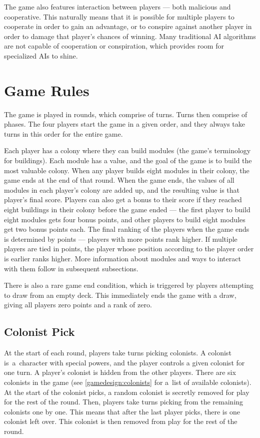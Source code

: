 The game also features interaction between players --- both malicious and cooperative.
This naturally means that it is possible for multiple players to cooperate in order
to gain an advantage, or to conspire against another player in order to damage
that player's chances of winning. Many traditional AI algorithms are not capable
of cooperation or conspiration, which provides room for specialized AIs to shine.

\section{Game Rules}

The game is played in rounds, which comprise of turns. Turns then comprise of phases.
The four players start the game in a given order, and they always take turns
in this order for the entire game.

Each player has a colony where they can build modules (the game's terminology for buildings).
Each module has a value, and the goal of the game is to build the most valuable colony.
When any player builds eight modules in their colony, the game ends at the end
of that round. When the game ends, the values of all modules in each player's colony
are added up, and the resulting value is that player's final score. Players can also
get a bonus to their score if they reached eight buildings in their colony before
the game ended --- the first player to build eight modules gets four bonus points,
and other players to build eight modules get two bonus points each.
The final ranking of the players when the game ends is determined by points --- players
with more points rank higher. If multiple players are tied in points, the player whose
position according to the player order is earlier ranks higher.
More information about modules and ways to interact with them follow in subsequent subsections.

There is also a rare game end condition, which is triggered by players attempting to
draw from an empty deck. This immediately ends the game with a draw, giving all
players zero points and a rank of zero.

\subsection{Colonist Pick}

At the start of each round, players take turns picking colonists. A colonist is~a~character
with special powers, and the player controls a given colonist for one turn. A player's
colonist is hidden from the other players.
There are six colonists in the game (see \autoref{gamedesign:colonists} for a~list
of available colonists). At the start of the colonist picks, a random colonist is
secretly removed for play for the rest of the round. Then, players take turns
picking from the remaining colonists one by one. This means that after the last
player picks, there is one colonist left over. This colonist is then removed from
play for the rest of the round.

